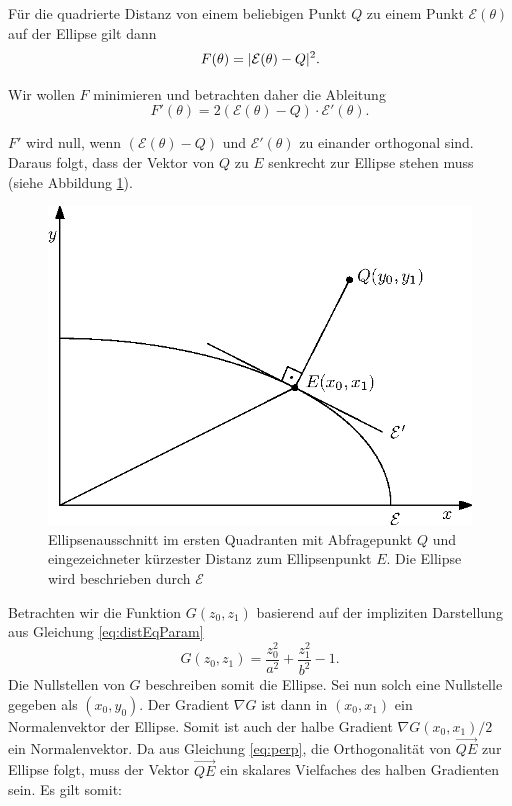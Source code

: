 Für die quadrierte Distanz von einem beliebigen Punkt $Q$ zu einem Punkt $\mathcal{E}(\theta)$ auf der Ellipse gilt dann
\begin{equation}
	F(\theta) = \lvert\mathcal{E}(\theta) - Q\rvert^2.
\end{equation}

Wir wollen $F$ minimieren und betrachten daher die Ableitung
\begin{equation}\label{eq:perp}
F'(\theta) = 2\left(\mathcal{E}(\theta) - Q\right) \cdot \mathcal{E}'(\theta).
\end{equation}

$F'$ wird null, wenn $\left(\mathcal{E}(\theta) - Q\right)$ und $ \mathcal{E}'(\theta)$ zu einander orthogonal sind. Daraus folgt, dass der Vektor von $Q$ zu $E$ senkrecht zur Ellipse stehen muss (siehe Abbildung \ref{fig:ellipseDist}).


\begin{figure}[!htb]
	\centering
	\includegraphics[scale=.9]{images/ellipseQuery.eps}
	\caption{Ellipsenausschnitt im ersten Quadranten mit Abfragepunkt $Q$ und eingezeichneter kürzester Distanz zum Ellipsenpunkt $E$. Die Ellipse wird beschrieben durch $\mathcal{E}$}
	\label{fig:ellipseDist}
\end{figure}

Betrachten wir die Funktion $G(z_0,z_1)$ basierend auf der impliziten Darstellung aus Gleichung \ref{eq:distEqParam}
\begin{equation} \label{eq:ellipseDistEq}
	G(z_0,z_1) = \frac{z_0^2}{a^2} + \frac{z_1^2}{b^2} - 1.
\end{equation}
Die Nullstellen von $G$ beschreiben somit die Ellipse. Sei nun solch eine Nullstelle gegeben als $(x_0,y_0)$. Der Gradient $\nabla G$ ist dann in $(x_0,x_1)$ ein Normalenvektor der Ellipse. Somit ist auch der halbe Gradient $\nabla G(x_0,x_1)/2$ ein Normalenvektor. Da aus Gleichung \ref{eq:perp}, die Orthogonalität von $\overrightarrow{QE}$ zur Ellipse folgt,  muss der Vektor  $\overrightarrow{QE}$ ein skalares Vielfaches des halben Gradienten sein. Es gilt somit:

